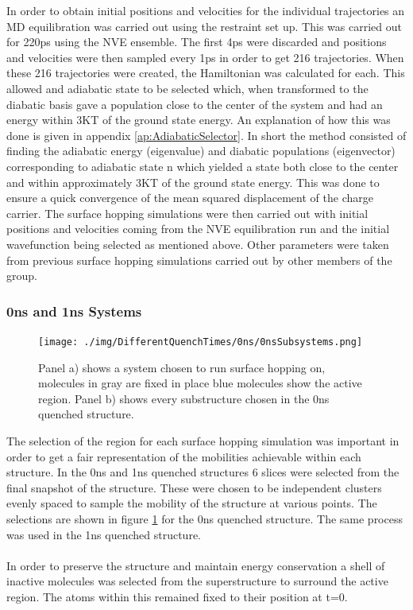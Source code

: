In order to obtain initial positions and velocities for the individual trajectories an MD equilibration was carried out using the restraint set up. This was carried out for 220ps using the NVE ensemble. The first 4ps were discarded and positions and velocities were then sampled every 1ps in order to get 216 trajectories. When these 216 trajectories were created, the Hamiltonian was calculated for each. This allowed and adiabatic state to be selected which, when transformed to the diabatic basis gave a population close to the center of the system and had an energy within 3KT of the ground state energy. An explanation of how this was done is given in appendix \ref{ap:AdiabaticSelector}. In short the method consisted of finding the adiabatic energy (eigenvalue) and diabatic populations (eigenvector) corresponding to adiabatic state n which yielded a state both close to the center and within approximately 3KT of the ground state energy. This was done to ensure a quick convergence of the mean squared displacement of the charge carrier. The surface hopping simulations were then carried out with initial positions and velocities coming from the NVE equilibration run and the initial wavefunction being selected as mentioned above. Other parameters were taken from previous surface hopping simulations carried out by other members of the group.

\subsubsection{0ns and 1ns Systems}
\begin{figure}[h]
	\texttt{[image: ./img/DifferentQuenchTimes/0ns/0nsSubsystems.png]}
	\caption{\label{fig:0nsSubSys}Panel a) shows a system chosen to run surface hopping on, molecules in gray are fixed in place blue molecules show the active region. Panel b) shows every substructure chosen in the 0ns quenched structure.}
\end{figure}
The selection of the region for each surface hopping simulation was important in order to get a fair representation of the mobilities achievable within each structure. In the 0ns and 1ns quenched structures 6 slices were selected from the final snapshot of the structure. These were chosen to be independent clusters evenly spaced to sample the mobility of the structure at various points. The selections are shown in figure \ref{fig:0nsSubSys} for the 0ns quenched structure. The same process was used in the 1ns quenched structure.
\\\\
In order to preserve the structure and maintain energy conservation a shell of inactive molecules was selected from the superstructure to surround the active region. The atoms within this remained fixed to their position at t=0.
